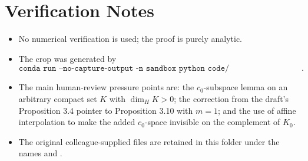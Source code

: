 \documentclass[11pt]{article}
\newcommand{\dimH}{\dim_{\!H}}
\begin{document}
\section*{Verification Notes}

\begin{itemize}[leftmargin=*]
\item No numerical verification is used; the proof is purely analytic.
\item The crop was generated by
\[
\texttt{conda run --no-capture-output -n sandbox python code/make\_open\_problem\_crop.py}.
\]
\item The main human-review pressure points are: the \(c_0\)-subspace lemma on
an arbitrary compact set \(K\) with \(\dimH K>0\); the correction from the
draft's Proposition 3.4 pointer to Proposition 3.10 with \(m=1\); and the use
of affine interpolation to make the added \(c_0\)-space invisible on the
complement of \(K_0\).
\item The original colleague-supplied files are retained in this folder under
the names  and
.
\end{itemize}
\end{document}
